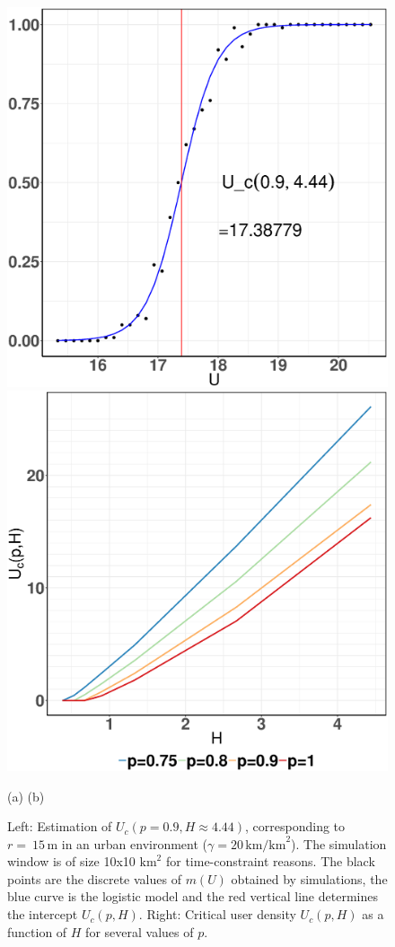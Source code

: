 \documentclass[conference]{IEEEtran}
\begin{document}
\begin{figure}[t!]
\centerline{
\includegraphics[width=0.48\linewidth]{Figures/Uc-twovar-example}
\hspace{0.01\linewidth}
\includegraphics[width=0.48\linewidth]{Figures/critical-U-several-p}}
\centerline{\footnotesize\hspace{0.25\linewidth} (a)\hspace{0.5\linewidth} (b) \hspace{0.25\linewidth}\ }
\caption{Left: Estimation of $U_{c}(p=0.9,H \approx 4.44)$, corresponding to $r=~15 \, \text{m}$ in an urban environment ($\gamma = 20 \, \text{km/km}^{2}$). The simulation window is of size 10x10 $\text{km}^{2}$ for time-constraint reasons. The black points are the discrete values of $m(U)$ obtained by simulations,  the blue curve is the logistic model and the red vertical line determines the intercept $U_{c}(p,H)$. Right: Critical user density $U_c(p,H)$ as a function of $H$ for several values of $p$.}
\label{critical-user-estimation-twovar}
\end{figure}
\end{document}
